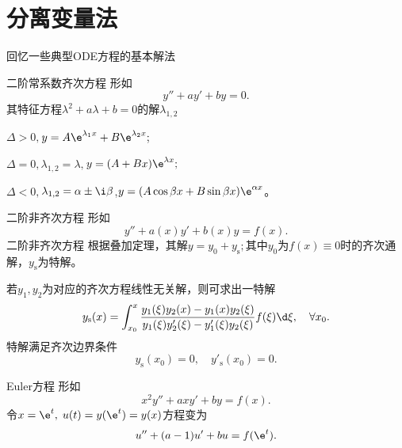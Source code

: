 \chapter{分离变量法}
回忆一些典型ODE方程的基本解法
\begin{method}{二阶常系数齐次方程}{}
	形如
	\begin{equation}
		y''+ay'+by=0.
	\end{equation}
	其特征方程$\lambda^2+a\lambda+b=0$的解$\lambda_{1,2}$
	\begin{compactenum}[I.]
		\item $\Delta>0,$\quad$y=A\e^{\lambda_1x}+B\e^{\lambda_2x};$
		\item $\Delta=0,$\quad$\lambda_{1,2}=\lambda,$\quad$y=(A+Bx)\e^{\lambda x};$
		\item $\Delta<0,$\quad$\lambda_{1,2}=\alpha\pm\i\beta$,\quad$y=(A\cos\beta x+B\sin\beta x)\e^{\alpha x}$。
	\end{compactenum}
\end{method}
\begin{method}{二阶非齐次方程}{}
	形如
	\begin{equation}
		y''+a(x)y'+b(x)y=f(x).
	\end{equation}
	二阶非齐次方程
	根据叠加定理，其解$y=y_0+y_\mathrm s;$其中$y_0$为$f(x)\equiv 0$时的齐次通解，$y_\mathrm s$为特解。
	
	若$y_1,y_2$为对应的齐次方程线性无关解，则可求出一特解
	\begin{align}\label{General to Particular Solution}
		y_\mathrm s(x)=\int_{x_0}^x\frac{y_1(\xi)y_2(x)-y_1(x)y_2(\xi)}{y_1(\xi)y_2'(\xi)-y_1'(\xi)y_2(\xi)}f(\xi)\d \xi,\quad\forall x_0.
	\end{align}
	特解满足齐次边界条件
	\[
		y_\mathrm s(x_0)=0,\quad y'_\mathrm s(x_0)=0.
	\]
\end{method}
\begin{method}{Euler方程}{}
	形如
	\begin{equation}
		x^2y''+axy'+by=f(x).
	\end{equation}
	令$x=\e^t,\;u(t)=y(\e^t)=y(x)$方程变为
	\begin{align}
		u''+(a-1)u'+bu=f(\e^t).
	\end{align}
\end{method}

